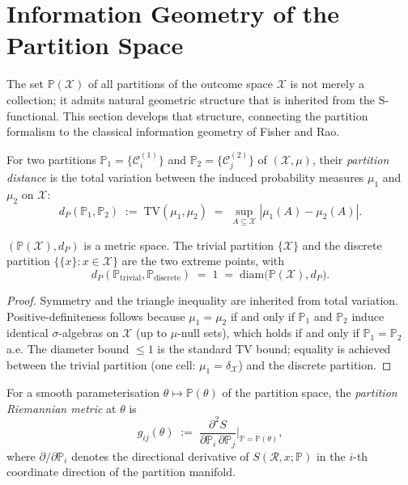 \section{Information Geometry of the Partition Space}
\label{sec:ch02-information-geometry}

The set $\mathbb{P}(\mathcal{X})$ of all partitions of the outcome space
$\mathcal{X}$ is not merely a collection; it admits natural geometric structure
that is inherited from the S-functional.  This section develops that structure,
connecting the partition formalism to the classical information geometry of
Fisher and Rao.

\begin{definition}
\label{def:ch02-partition-distance}
For two partitions $\mathbb{P}_1 = \{\mathcal{C}_i^{(1)}\}$ and
$\mathbb{P}_2 = \{\mathcal{C}_j^{(2)}\}$ of $(\mathcal{X}, \mu)$, their
\emph{partition distance} is the total variation between the induced probability
measures $\mu_1$ and $\mu_2$ on $\mathcal{X}$:
\[
  d_P(\mathbb{P}_1, \mathbb{P}_2)
  \;:=\;
  \mathrm{TV}(\mu_1, \mu_2)
  \;=\;
  \sup_{A \subseteq \mathcal{X}} |\mu_1(A) - \mu_2(A)|.
\]
\end{definition}

\begin{proposition}
\label{prop:ch02-partition-metric}
$(\mathbb{P}(\mathcal{X}), d_P)$ is a metric space.  The trivial partition
$\{\mathcal{X}\}$ and the discrete partition $\{\{x\} : x \in \mathcal{X}\}$
are the two extreme points, with
\[
  d_P(\mathbb{P}_{\mathrm{trivial}}, \mathbb{P}_{\mathrm{discrete}})
  \;=\;
  1 \;=\; \mathrm{diam}\bigl(\mathbb{P}(\mathcal{X}), d_P\bigr).
\]
\end{proposition}

\begin{proof}
Symmetry and the triangle inequality are inherited from total variation.
Positive-definiteness follows because $\mu_1 = \mu_2$ if and only if
$\mathbb{P}_1$ and $\mathbb{P}_2$ induce identical $\sigma$-algebras on
$\mathcal{X}$ (up to $\mu$-null sets), which holds if and only if
$\mathbb{P}_1 = \mathbb{P}_2$ a.e.  The diameter bound $\leq 1$ is the standard
TV bound; equality is achieved between the trivial partition (one cell:
$\mu_1 = \delta_{\mathcal{X}}$) and the discrete partition.
\end{proof}

\begin{definition}
\label{def:ch02-riemannian}
For a smooth parameterisation $\theta \mapsto \mathbb{P}(\theta)$ of the
partition space, the \emph{partition Riemannian metric} at $\theta$ is
\[
  g_{ij}(\theta)
  \;:=\;
  \frac{\partial^2 S}{\partial \mathbb{P}_i \,\partial \mathbb{P}_j}
  \Bigg|_{\mathbb{P} = \mathbb{P}(\theta)},
\]
where $\partial/\partial \mathbb{P}_i$ denotes the directional derivative of
$S(\mathcal{R}, x; \mathbb{P})$ in the $i$-th coordinate direction of the
partition manifold.
\end{definition}

